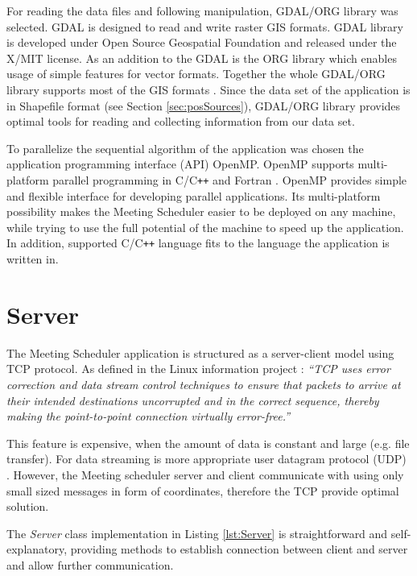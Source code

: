 \documentclass[thesis=M,english]{FITthesis}[2012/10/20]
\begin{document}
For reading the data files and following manipulation, GDAL/ORG library was selected. GDAL is designed to read and write raster GIS formats. GDAL library is developed under Open Source Geospatial Foundation and released under the X/MIT license\cite{GDAL17}. 
As an addition to the GDAL is the ORG library which enables usage of simple features for vector formats. Together the whole GDAL/ORG library supports most of the GIS formats \cite{GDAL117}. %
Since the data set of the application is in Shapefile format (see Section \ref{sec:posSources}), GDAL/ORG library provides optimal tools for reading and collecting information from our data set.

To parallelize the sequential algorithm of the application was chosen the application programming interface (API) OpenMP. OpenMP supports multi-platform parallel programming in C/C\texttt{++} and Fortran \cite{OpenMP17}. OpenMP provides simple and flexible interface for developing parallel applications. Its multi-platform possibility makes the Meeting Scheduler easier to be deployed on any machine, while trying to use the full potential of the machine to speed up the application. In addition, supported C/C\texttt{++} language fits to the language the application is written in.

\section{Server}
\label{sec:server}
The Meeting Scheduler application is structured as a server-client model using TCP protocol. As defined in the Linux information project \cite{TCP17}:  \textit{``TCP uses error correction and data stream control techniques to ensure that packets to arrive at their intended destinations uncorrupted and in the correct sequence, thereby making the point-to-point connection virtually error-free.''} 

This feature is expensive, when the amount of data is constant and large (e.g. file transfer). For data streaming is more appropriate user datagram protocol (UDP) \cite{Kurose10}.
However, the Meeting scheduler server and client communicate with using only small sized messages in form of coordinates, therefore the TCP provide optimal solution. 

The \textit{Server} class implementation in Listing \ref{lst:Server} is straightforward and self-explanatory, providing methods to establish connection between client and server and allow further communication.
\end{document}
